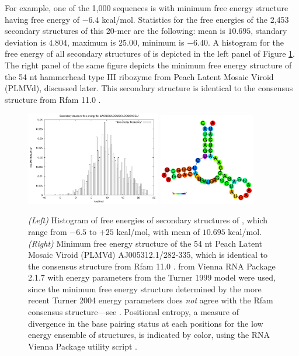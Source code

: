 For example, one of the 1,000 sequences is  with
minimum free energy structure  having free
energy of $-6.4$ kcal/mol. Statistics for the free energies of the
2,453 secondary structures of this 20-mer are the following: mean is
$10.695$, standary deviation is $4.804$, maximum is $25.00$, minimum
is $-6.40$. A histogram for the free energy of all secondary
structures of  is depicted in
the left panel of Figure \ref{fig:hermes:plmv}. The right panel of the
same figure depicts the minimum free energy structure of the
54 nt hammerhead type III ribozyme from Peach Latent Mosaic Viroid
(PLMVd), discussed later. This secondary structure is identical
to the consensus structure from Rfam 11.0 \citep{Gardner.nar11}.

\begin{figure}[!ht]
\centering
\includegraphics[width=0.525\textwidth]{Figures/Hermes/plmvDist.pdf}
\quad
\includegraphics[width=0.375\textwidth]{Figures/Hermes/plmvStr.pdf}
\caption{
{\em (Left)} Histogram of free energies of secondary structures of
, which range from $-6.5$ to $+25$ kcal/mol, with
mean of $10.695$ kcal/mol.
{\em (Right)} Minimum free energy structure of the 54 nt Peach Latent Mosaic
Viroid (PLMVd) AJ005312.1/282-335, which is identical to the consensus
structure from Rfam 11.0 \citep{Gardner.nar11}. \rfold from
Vienna RNA Package 2.1.7 with energy parameters from the Turner 1999
model were used, since the minimum free energy structure determined by
the more recent Turner 2004 energy parameters
does {\em not} agree with the Rfam consensus structure---see
\citep{synthetichammerheads}. Positional entropy, a measure
of divergence in the base pairing status at each positions for the
low energy ensemble of structures, is indicated by color, using the
RNA Vienna Package utility script .
}
\label{fig:hermes:plmv}
\end{figure}

